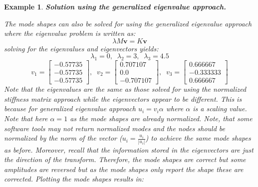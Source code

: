 \documentclass[12pt,letter]{article}
\newtheorem{ex}{Example}
\numberwithin{ex}{section} %
\newenvironment{example}{\begin{mdframed}[middlelinewidth=0.5mm]\begin{ex}\normalfont}{\end{ex}\end{mdframed}}
\numberwithin{re}{section} %
\begin{document}
\begin{example}
\vspace{2ex}
\noindent \textbf{Solution using the generalized eigenvalue approach.}
\vspace{1ex}

The mode shapes can also be solved for using the generalized eigenvalue approach where the eigenvalue problem is written as:
\begin{equation}
\lambda M \textbf{v} = K \textbf{v}
\end{equation}
solving for the eigenvalues and eigenvectors yields:
\begin{equation}
\lambda_1 = 0, \; \; \lambda_2 = 3, \; \; \lambda_3 = 4.5
\end{equation}
\begin{equation}
v_1 = \begin{bmatrix} -0.57735 \\    -0.57735 \\   -0.57735  \end{bmatrix}, \; \; v_2 = \begin{bmatrix} 0.707107 \\    0.0 \\    -0.707107 \end{bmatrix}, \; \; v_3 = \begin{bmatrix} 0.666667 \\    -0.333333 \\    0.666667  \end{bmatrix}
\end{equation}
Note that the eigenvalues are the same as those solved for using the normalized stiffness matrix approach while the eigenvectors appear to be different. This is because for generalized eigenvalue approach $u_i=v_i \alpha$ where $\alpha$ is a scaling value. Note that here $\alpha=1$ as the mode shapes are already normalized. Note, that some software tools may not return normalized modes and the nodes should be normalized by the norm of the vector ($u_i = \frac{u_i}{|u_i|}$) to achieve the same mode shapes as before. Moreover, recall that the information stored in the eigenvectors are just the direction of the transform. Therefore, the mode shapes are correct but some amplitudes are reversed but as the mode shapes only report the shape these are corrected.  Plotting the mode shapes results in:


\end{example}
\end{document}
